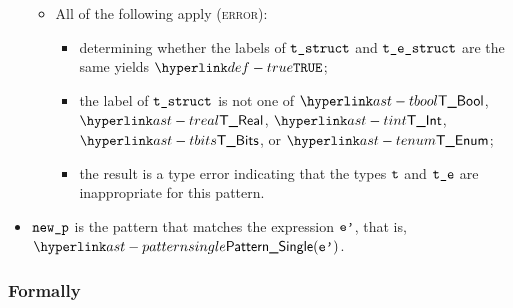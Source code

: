 \begin{itemize}
\begin{itemize}
    \item All of the following apply (\textsc{error}):
    \begin{itemize}
      \item determining whether the labels of $\vtstruct$ and $\testruct$ are the same yields $\True$\ProseOrTypeError;
      \item the label of $\vtstruct$ is not one of $\TBool$, $\TReal$, $\TInt$, $\TBits$, or $\TEnum$;
      \item the result is a type error indicating that the types $\vt$ and $\vte$ are inappropriate for this pattern.
    \end{itemize}
  \end{itemize}
  \item $\newp$ is the pattern that matches the expression $\vep$, that is, $\PatternSingle(\vep)$.
\end{itemize}
\subsubsection{Formally}
\begin{mathpar}
\end{mathpar}

